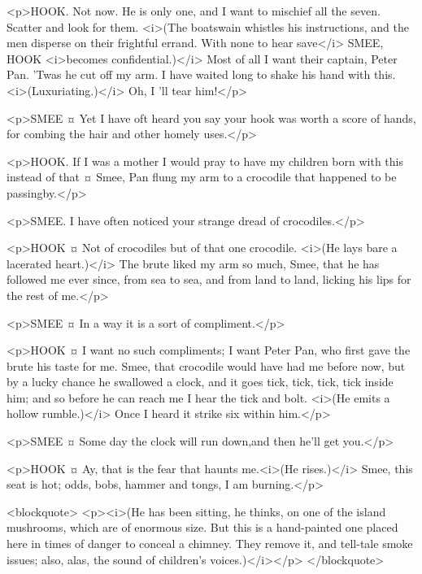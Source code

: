 <p>HOOK. Not now. He is only one, and I want to mischief all the seven. Scatter and look for them. <i>(The boatswain whistles his instructions, and the men disperse on their frightful errand. With none to hear save</i> SMEE, HOOK <i>becomes confidential.)</i> Most of all I want their captain, Peter Pan. 'Twas he cut off my arm. I have waited long to shake his hand with this. <i>(Luxuriating.)</i> Oh, I 'll tear him!</p>

<p>SMEE ¤
Yet I have oft heard you say your hook was worth a score of hands, for combing the hair and other homely uses.</p>

<p>HOOK. If I was a mother I would pray to have my children born with this instead of that ¤
Smee, Pan flung my arm to a crocodile that happened to be passingby.</p>

<p>SMEE. I have often noticed your strange dread of crocodiles.</p>

<p>HOOK ¤
Not of crocodiles but of that one crocodile. <i>(He lays bare a lacerated heart.)</i> The brute liked my arm so much, Smee, that he has followed me ever since, from sea to sea, and from land to land, licking his lips for the rest of me.</p>

<p>SMEE ¤
In a way it is a sort of compliment.</p>

<p>HOOK ¤
I want no such compliments; I want Peter Pan, who first gave the brute his taste for me. Smee, that crocodile would have had me before now, but by a lucky chance he swallowed a clock, and it goes tick, tick, tick, tick inside him; and so before he can reach me I hear the tick and bolt. <i>(He emits a hollow rumble.)</i> Once I heard it strike six within him.</p>

<p>SMEE ¤
Some day the clock will run down,and then he'll get you.</p>

<p>HOOK ¤
Ay, that is the fear that haunts me.<i>(He rises.)</i> Smee, this seat is hot; odds, bobs, hammer and tongs, I am burning.</p>

<blockquote> <p><i>(He has been sitting, he thinks, on one of the island mushrooms, which are of enormous size. But this is a hand-painted one placed here in times of danger to conceal a chimney. They remove it, and tell-tale smoke issues; also, alas, the sound of children's voices.)</i></p> </blockquote>

